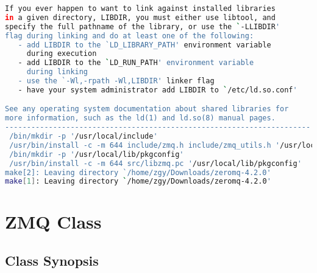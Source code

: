 \begin{lstlisting}[language=bash]
If you ever happen to want to link against installed libraries
in a given directory, LIBDIR, you must either use libtool, and
specify the full pathname of the library, or use the `-LLIBDIR'
flag during linking and do at least one of the following:
   - add LIBDIR to the `LD_LIBRARY_PATH' environment variable
     during execution
   - add LIBDIR to the `LD_RUN_PATH' environment variable
     during linking
   - use the `-Wl,-rpath -Wl,LIBDIR' linker flag
   - have your system administrator add LIBDIR to `/etc/ld.so.conf'

See any operating system documentation about shared libraries for
more information, such as the ld(1) and ld.so(8) manual pages.
----------------------------------------------------------------------
 /bin/mkdir -p '/usr/local/include'
 /usr/bin/install -c -m 644 include/zmq.h include/zmq_utils.h '/usr/local/include'
 /bin/mkdir -p '/usr/local/lib/pkgconfig'
 /usr/bin/install -c -m 644 src/libzmq.pc '/usr/local/lib/pkgconfig'
make[2]: Leaving directory `/home/zgy/Downloads/zeromq-4.2.0'
make[1]: Leaving directory `/home/zgy/Downloads/zeromq-4.2.0'
\end{lstlisting}


\chapter{ZMQ Class}

\section{Class Synopsis}



